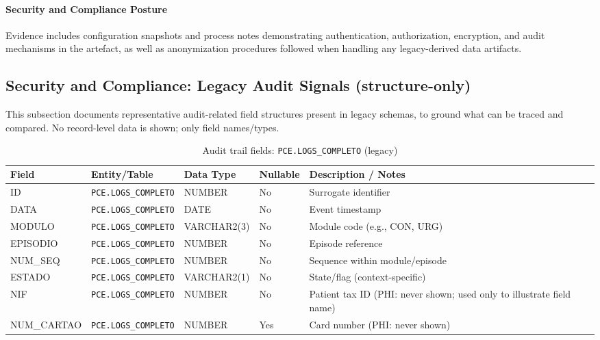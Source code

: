 \paragraph{Security and Compliance Posture}
Evidence includes configuration snapshots and process notes demonstrating authentication, authorization, encryption, and audit mechanisms in the artefact, as well as anonymization procedures followed when handling any legacy-derived data artifacts.

\subsection*{Security and Compliance: Legacy Audit Signals (structure-only)}
This subsection documents representative audit-related field structures present in legacy schemas, to ground what can be traced and compared. No record-level data is shown; only field names/types.

\begin{table}[H]
    \centering
    \caption{Audit trail fields: \texttt{PCE.LOGS\_COMPLETO} (legacy)}
    \label{tab:audit_logs_completo_fields}
    {\setlength{\tabcolsep}{4pt}\small\renewcommand{\arraystretch}{1.2}
    \begin{tabularx}{\textwidth}{@{}>{\raggedright\arraybackslash}p{3.2cm} >{\raggedright\arraybackslash}p{3.0cm} >{\raggedright\arraybackslash}p{2.2cm} >{\centering\arraybackslash}p{1.7cm} >{\raggedright\arraybackslash}X@{}}
        \toprule
        \textbf{Field} & \textbf{Entity/Table} & \textbf{Data Type} & \textbf{Nullable} & \textbf{Description / Notes} \\
        \midrule
        ID & \texttt{PCE.LOGS\_COMPLETO} & NUMBER & No & Surrogate identifier \\
        DATA & \texttt{PCE.LOGS\_COMPLETO} & DATE & No & Event timestamp \\
        MODULO & \texttt{PCE.LOGS\_COMPLETO} & VARCHAR2(3) & No & Module code (e.g., CON, URG) \\
        EPISODIO & \texttt{PCE.LOGS\_COMPLETO} & NUMBER & No & Episode reference \\
        NUM\_SEQ & \texttt{PCE.LOGS\_COMPLETO} & NUMBER & No & Sequence within module/episode \\
        ESTADO & \texttt{PCE.LOGS\_COMPLETO} & VARCHAR2(1) & No & State/flag (context-specific) \\
        NIF & \texttt{PCE.LOGS\_COMPLETO} & NUMBER & No & Patient tax ID (PHI: never shown; used only to illustrate field name) \\
        NUM\_CARTAO & \texttt{PCE.LOGS\_COMPLETO} & NUMBER & Yes & Card number (PHI: never shown) \\
        \bottomrule
    \end{tabularx}}
\end{table}

